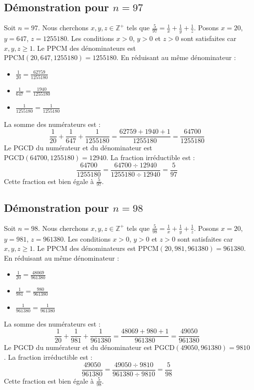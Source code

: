 \documentclass[11pt,a4paper]{article}
\begin{document}
\subsection{Démonstration pour $n = 97$}
Soit $n = 97$. Nous cherchons $x, y, z \in \mathbb{Z}^{+}$ tels que $\frac{5}{97} = \frac{1}{x} + \frac{1}{y} + \frac{1}{z}$.
Posons $x = 20$, $y = 647$, $z = 1255180$.
Les conditions $x > 0$, $y > 0$ et $z > 0$ sont satisfaites car $x, y, z \geq 1$.
Le PPCM des dénominateurs est $\text{PPCM}(20, 647, 1255180) = 1255180$.
En réduisant au même dénominateur :
\begin{itemize}
    \item $\frac{1}{20} = \frac{62759}{1255180}$
    \item $\frac{1}{647} = \frac{1940}{1255180}$
    \item $\frac{1}{1255180} = \frac{1}{1255180}$
\end{itemize}
La somme des numérateurs est :
$$ \frac{1}{20} + \frac{1}{647} + \frac{1}{1255180} = \frac{62759 + 1940 + 1}{1255180} = \frac{64700}{1255180} $$
Le PGCD du numérateur et du dénominateur est $\text{PGCD}(64700, 1255180) = 12940$.
La fraction irréductible est :
$$ \frac{64700}{1255180} = \frac{64700 \div 12940}{1255180 \div 12940} = \frac{5}{97} $$
Cette fraction est bien égale à $\frac{5}{97}$.

\subsection{Démonstration pour $n = 98$}
Soit $n = 98$. Nous cherchons $x, y, z \in \mathbb{Z}^{+}$ tels que $\frac{5}{98} = \frac{1}{x} + \frac{1}{y} + \frac{1}{z}$.
Posons $x = 20$, $y = 981$, $z = 961380$.
Les conditions $x > 0$, $y > 0$ et $z > 0$ sont satisfaites car $x, y, z \geq 1$.
Le PPCM des dénominateurs est $\text{PPCM}(20, 981, 961380) = 961380$.
En réduisant au même dénominateur :
\begin{itemize}
    \item $\frac{1}{20} = \frac{48069}{961380}$
    \item $\frac{1}{981} = \frac{980}{961380}$
    \item $\frac{1}{961380} = \frac{1}{961380}$
\end{itemize}
La somme des numérateurs est :
$$ \frac{1}{20} + \frac{1}{981} + \frac{1}{961380} = \frac{48069 + 980 + 1}{961380} = \frac{49050}{961380} $$
Le PGCD du numérateur et du dénominateur est $\text{PGCD}(49050, 961380) = 9810$.
La fraction irréductible est :
$$ \frac{49050}{961380} = \frac{49050 \div 9810}{961380 \div 9810} = \frac{5}{98} $$
Cette fraction est bien égale à $\frac{5}{98}$.
\end{document}
